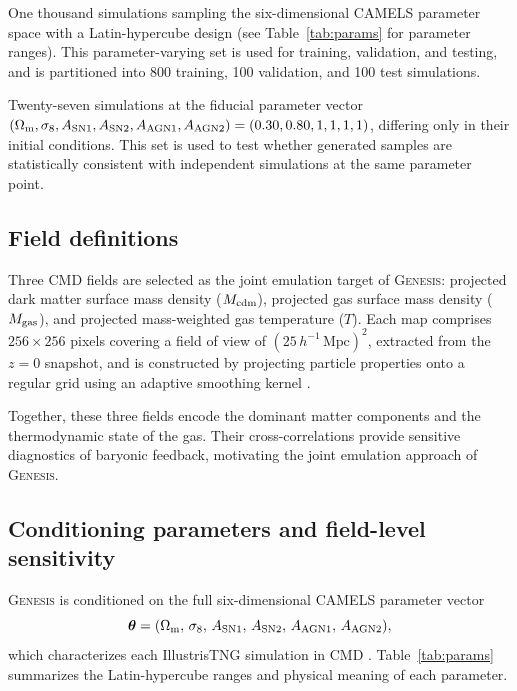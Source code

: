 \documentclass[usenatbib]{mnras}
\newcommand{\Mcdm}{M_{\rm cdm}}
\newcommand{\Mgas}{M_{\rm gas}}
\newcommand{\Tgas}{T}
\newcommand{\Om}{\Omega_{\rm m}}
\newcommand{\sig}{\sigma_8}
\begin{document}
\begin{description}[font=\normalfont\bfseries,leftmargin=2.2em,labelsep=0.6em]
  \item[LH set.] One thousand simulations sampling the
        six-dimensional CAMELS parameter space with a Latin-hypercube
        design (see Table~\ref{tab:params} for parameter ranges).
        This parameter-varying set is used for training, validation,
        and testing, and is partitioned into 800 training, 100
        validation, and 100 test simulations.
  \item[CV set.] Twenty-seven simulations at the fiducial parameter
        vector $(\Om, \sig, A_{\rm SN1}, A_{\rm SN2}, A_{\rm AGN1},
        A_{\rm AGN2}) = (0.30, 0.80, 1, 1, 1, 1)$, differing only
        in their initial conditions. This set is used to test whether
        generated samples are statistically consistent with
        independent simulations at the same parameter point.
\end{description}

\subsection{Field definitions}
\label{sec:fields}

Three CMD fields are selected as the joint emulation target of
\textsc{Genesis}: projected dark matter surface mass density
($\Mcdm$), projected gas surface mass density ($\Mgas$), and projected
mass-weighted gas temperature ($\Tgas$). Each map comprises
$256\times256$ pixels covering a field of view of
$(25\,h^{-1}\,\mathrm{Mpc})^2$, extracted from the $z=0$ snapshot, and
is constructed by projecting particle properties onto a regular grid
using an adaptive smoothing kernel \citep{Villaescusa2022}.

Together, these three fields encode the dominant matter components and
the thermodynamic state of the gas. Their cross-correlations provide
sensitive diagnostics of baryonic feedback, motivating the joint
emulation approach of \textsc{Genesis}.

\subsection{Conditioning parameters and field-level sensitivity}
\label{sec:params}

\textsc{Genesis} is conditioned on the full six-dimensional CAMELS
parameter vector
\begin{equation}
  \boldsymbol{\theta} =
  (\Om,\,\sig,\,A_{\rm SN1},\,A_{\rm SN2},\,A_{\rm AGN1},\,A_{\rm AGN2}),
  \label{eq:theta}
\end{equation}
which characterizes each IllustrisTNG simulation in CMD
\citep{Villaescusa2021,Villaescusa2022}.
Table~\ref{tab:params} summarizes the Latin-hypercube ranges and
physical meaning of each parameter.
\end{document}
